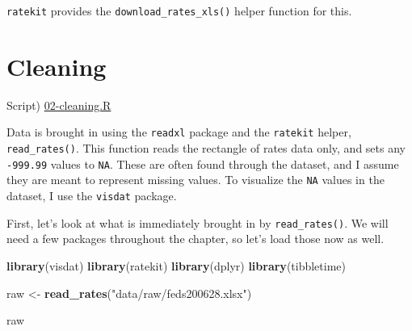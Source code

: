 \documentclass[]{book}
\newenvironment{Shaded}{\begin{snugshade}}{\end{snugshade}}
\newcommand{\KeywordTok}[1]{\textcolor[rgb]{0.13,0.29,0.53}{\textbf{#1}}}
\newcommand{\NormalTok}[1]{#1}
\newcommand{\StringTok}[1]{\textcolor[rgb]{0.31,0.60,0.02}{#1}}
\begin{document}
\texttt{ratekit} provides the \texttt{download\_rates\_xls()} helper
function for this.

\hypertarget{cleaning}{%
\section{Cleaning}\label{cleaning}}

Script) \href{./R/02-cleaning.R}{02-cleaning.R}

Data is brought in using the \texttt{readxl} package and the
\texttt{ratekit} helper, \texttt{read\_rates()}. This function reads the
rectangle of rates data only, and sets any \texttt{-999.99} values to
\texttt{NA}. These are often found through the dataset, and I assume
they are meant to represent missing values. To visualize the \texttt{NA}
values in the dataset, I use the \texttt{visdat} package.

First, let's look at what is immediately brought in by
\texttt{read\_rates()}. We will need a few packages throughout the
chapter, so let's load those now as well.

\begin{Shaded}
\begin{Highlighting}[]
\KeywordTok{library}\NormalTok{(visdat)}
\KeywordTok{library}\NormalTok{(ratekit)}
\KeywordTok{library}\NormalTok{(dplyr)}
\KeywordTok{library}\NormalTok{(tibbletime)}

\NormalTok{raw <-}\StringTok{ }\KeywordTok{read_rates}\NormalTok{(}\StringTok{"data/raw/feds200628.xlsx"}\NormalTok{)}

\NormalTok{raw}
\end{Highlighting}
\end{Shaded}
\end{document}
